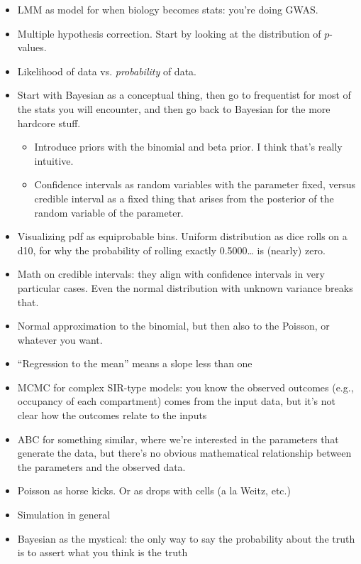 \documentclass{book}
\begin{document}
\begin{itemize}
\item
  LMM as model for when biology becomes stats: you're doing GWAS.
\item
  Multiple hypothesis correction. Start by looking at the distribution
  of \(p\)-values.
\item
  Likelihood of data vs. \emph{probability} of data.
\item
  Start with Bayesian as a conceptual thing, then go to frequentist for
  most of the stats you will encounter, and then go back to Bayesian for
  the more hardcore stuff.

  \begin{itemize}
  \item
    Introduce priors with the binomial and beta prior. I think that's
    really intuitive.
  \item
    Confidence intervals as random variables with the parameter fixed,
    versus credible interval as a fixed thing that arises from the
    posterior of the random variable of the parameter.
  \end{itemize}
\item
  Visualizing pdf as equiprobable bins. Uniform distribution as dice
  rolls on a d10, for why the probability of rolling exactly
  0.5000\ldots{} is (nearly) zero.
\item
  Math on credible intervals: they align with confidence intervals in
  very particular cases. Even the normal distribution with unknown
  variance breaks that.
\item
  Normal approximation to the binomial, but then also to the Poisson, or
  whatever you want.
\item
  ``Regression to the mean'' means a slope less than one
\item
  MCMC for complex SIR-type models: you know the observed outcomes
  (e.g., occupancy of each compartment) comes from the input data, but
  it's not clear how the outcomes relate to the inputs
\item
  ABC for something similar, where we're interested in the parameters
  that generate the data, but there's no obvious mathematical
  relationship between the parameters and the observed data.
\item
  Poisson as horse kicks. Or as drops with cells (a la Weitz, etc.)
\item
  Simulation in general
\item
  Bayesian as the mystical: the only way to say the probability about
  the truth is to assert what you think is the truth

\end{itemize}
\end{document}
